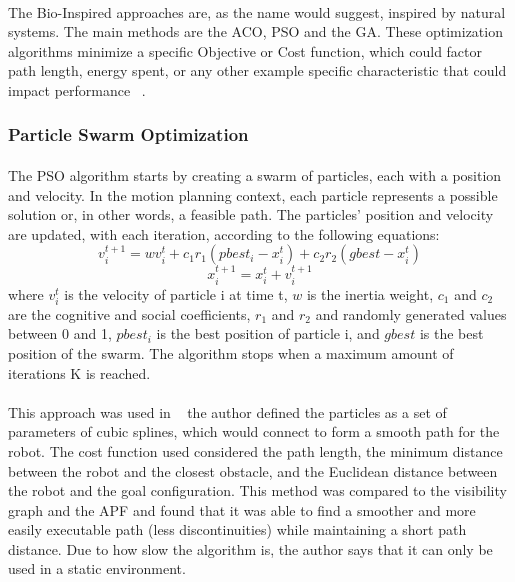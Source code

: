 \paragraph{}The Bio-Inspired approaches are, as the name would suggest, inspired by natural systems. The main methods are the \gls{ACO},
\gls{PSO} and the \gls{GA}. These optimization algorithms minimize a specific
Objective or Cost function, which could factor path length, energy spent, or any other example specific characteristic
that could impact performance ~\cite{s23063051}. 
\subsubsection{Particle Swarm Optimization}
\label{subsubsec:PSO}
\paragraph{}The \gls{PSO} algorithm starts by creating a swarm of particles, each with a position and velocity. In the motion planning context,
each particle represents a possible solution or, in other words, a feasible path. The particles' position and velocity are updated, with each iteration, according to 
the following equations:
\begin{equation}
    v_{i}^{t+1} = wv_{i}^{t} + c_{1}r_{1}(pbest_{i} - x_{i}^{t}) + c_{2}r_{2}(gbest - x_{i}^{t})
\end{equation}
\begin{equation}
    x_{i}^{t+1} = x_{i}^{t} + v_{i}^{t+1}
\end{equation}
where $v_{i}^{t}$ is the velocity of particle i at time t, $w$ is the inertia weight, $c_{1}$ and $c_{2}$ are the cognitive and social coefficients,
$r_{1}$ and $r_{2}$ and randomly generated values between 0 and 1, $pbest_{i}$ is the best position of particle i, and $gbest$ is the best position of the swarm.
The algorithm stops when a maximum amount of iterations K is reached.
\paragraph{}This approach was used in ~\cite{4178249} the author defined the particles as a set of parameters of cubic splines, which would connect to form
a smooth path for the robot. The cost function used considered the path length, the minimum distance between the robot and
the closest obstacle, and the Euclidean distance between the robot and the goal configuration. This method was compared to the
visibility graph and the \gls{APF} and found that it was able to find a smoother and more easily executable path (less discontinuities)
while maintaining a short path distance. Due to how slow the algorithm is, the author says that it can only be used in a static
environment.
